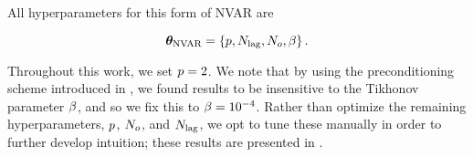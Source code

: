 All hyperparameters for this form of NVAR are
\begin{linenomath*}\begin{equation*}
    \bm{\theta}_\text{NVAR} =
    \{ p, N_\text{lag}, N_{o}, \beta \} \, .
\end{equation*}\end{linenomath*}
Throughout this work, we set $p = 2$.
We note that by using the preconditioning scheme introduced in
\citet{chen_next_2022},
we found results to be insensitive to the Tikhonov parameter $\beta$, and so
we fix this to $\beta = 10^{-4}$.
Rather than optimize the remaining hyperparameters,
$p$, $N_{o}$, and $N_\text{lag}$, we opt to tune
these manually in order to further develop intuition; these results are
presented in .

